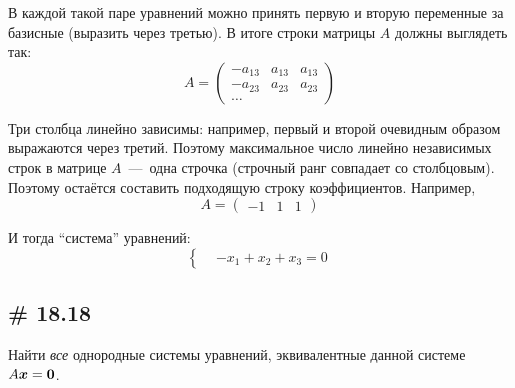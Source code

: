 \documentclass[a4paper,12pt]{article}
\begin{document}
\begin{solution}
    В каждой такой паре уравнений можно принять первую и вторую переменные за базисные (выразить через третью).
    В итоге строки матрицы $A$ должны выглядеть так:
    \[
      A = \begin{pmatrix}
        -a_{13} & a_{13} & a_{13}\\
        -a_{23} & a_{23} & a_{23}\\
        \ldots
      \end{pmatrix}
    \]
    
    Три столбца линейно зависимы: например, первый и второй очевидным образом выражаются через третий.
    Поэтому максимальное число линейно независимых строк в матрице $A$~---~одна строчка (строчный ранг совпадает со столбцовым).
    Поэтому остаётся составить подходящую строку коэффициентов.
    Например,
    \[
      A = \begin{pmatrix}
        -1 & 1 & 1
      \end{pmatrix}
    \]
    
    И тогда ``система'' уравнений:
    \[
      \left\{
        \begin{aligned}
          &-x_1 + x_2 + x_3 = 0
        \end{aligned}
      \right.
    \]
  \end{solution}
  
  
  
  \subsection{\# 18.18}
  \label{sec:18-18}
  
  Найти \emph{все} однородные системы уравнений, эквивалентные данной системе $A \bds x \hm= \bds 0$.
  
\end{document}
